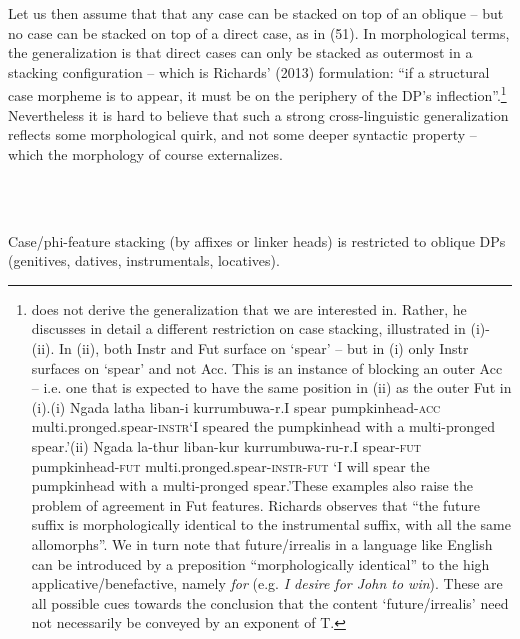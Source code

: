 \documentclass[output=paper]{langsci/langscibook}
\begin{document}
\begin{styleparagrafo}
Let us then assume that that any case can be stacked on top of an oblique – but no case can be stacked on top of a direct case, as in (51). In morphological terms, the generalization is that direct cases can only be stacked as outermost in a stacking configuration – which is Richards’ (2013) formulation: “if a structural case morpheme is to appear, it must be on the periphery of the DP’s inflection”.\footnote{\citet{Richards2013} does not derive the generalization that we are interested in. Rather, he discusses in detail a different restriction on case stacking, illustrated in (i)-(ii). In (ii), both Instr and Fut surface on ‘spear’ – but in (i) only Instr surfaces on ‘spear’ and not Acc. This is an instance of blocking an outer Acc – i.e. one that is expected to have the same position in (ii) as the outer Fut in (i).(i)   Ngada latha   liban-i       kurrumbuwa-r.I   spear   pumpkinhead-\textsc{acc}   multi.pronged.spear-\textsc{instr}‘I speared the pumpkinhead with a multi-pronged spear.’(ii)  Ngada     la-thur     liban-kur     kurrumbuwa-ru-r.I     spear-\textsc{fut}   pumpkinhead-\textsc{fut}   multi.pronged.spear-\textsc{instr-fut} ‘I will spear the pumpkinhead with a multi-pronged spear.’These examples also raise the problem of agreement in Fut features. Richards observes that “the future suffix is morphologically identical to the instrumental suffix, with all the same allomorphs”. We in turn note that future/irrealis in a language like English can be introduced by a preposition “morphologically identical” to the high applicative/benefactive, namely \textit{for} (e.g. \textit{I desire for John to win}). These are all possible cues towards the conclusion that the content ‘future/irrealis’ need not necessarily be conveyed by an exponent of T.}  Nevertheless it is hard to believe that such a strong cross-linguistic generalization reflects some morphological quirk, and not some deeper syntactic property – which the morphology of course externalizes. 
\end{styleparagrafo}

\ea%
    \label{ex:key:51}
    \gll\\
        \\
    \glt
    \z

          Case/phi-feature stacking (by affixes or linker heads) is restricted to oblique DPs (genitives, datives, instrumentals, locatives).  
\end{document}
